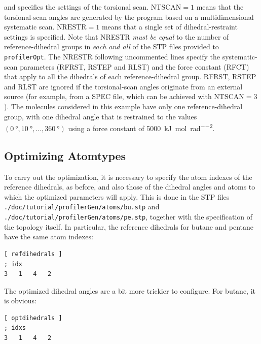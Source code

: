 \documentclass[10pt,a4paper,openany]{memoir}
\numberwithin{equation}{section}
\newcommand{\profileropt}[0]{\texttt{profilerOpt}}
\newcommand{\varset}[2]{$\text{#1}=#2$}
\begin{document}
\noindent and specifies the settings of the torsional scan.  \varset{NTSCAN}{1}
means that the torsional-scan angles are generated by the program based on a
multidimensional systematic scan.  \varset{NRESTR}{1} means that a single set of
dihedral-restraint settings is specified.  Note that NRESTR \textit{must be
  equal} to the number of reference-dihedral groups in \textit{each and all} of
the STP files provided to \profileropt{}. The NRESTR following uncommented lines
specify the systematic-scan parameters (RFRST, RSTEP and RLST) and the force
constant (RFCT) that apply to all the dihedrals of each reference-dihedral
group.  RFRST, RSTEP and RLST are ignored if the torsional-scan angles originate
from an external source (for example, from a SPEC file, which can be achieved
with \varset{NTSCAN}{3}).  The molecules considered in this example have only
one reference-dihedral group, with one dihedral angle that is restrained to the
values $(\SI{0}{\degree},\SI{10}{\degree},\ldots,\SI{360}{\degree})$ using a
force constant of \SI{5000}{\kJ\per\mole\per\radian\squared}.

\subsection{Optimizing Atomtypes}
\label{sec:tutorial-profileropt-atoms}

To carry out the optimization, it is necessary to specify the atom indexes of
the reference dihedrals, as before, and also those of the dihedral angles and
atoms to which the optimized parameters will apply.
%
This is done in the STP files
\texttt{./doc/tutorial/profilerGen/atoms/bu.stp} and
\texttt{./doc/tutorial/profilerGen/atoms/pe.stp}, together with the
specification of the topology itself.
%
In particular, the reference dihedrals for butane and pentane have the same atom
indexes:

\begin{lstlisting}[language=gromacs]
[ refdihedrals ]
; idx
3   1   4   2
\end{lstlisting}\vspace{2ex}\par

The optimized dihedral angles are a bit more trickier to configure.
For butane, it is obvious:

\begin{lstlisting}[language=gromacs]
[ optdihedrals ]
; idxs
3   1   4   2   
\end{lstlisting}\vspace{2ex}\par
\end{document}
